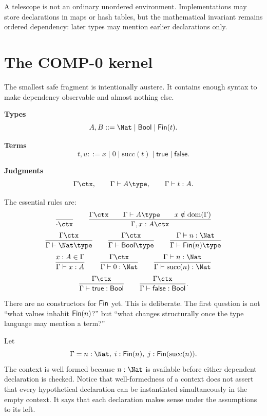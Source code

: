 \documentclass[11pt,openany]{book}
\begin{document}
\begin{warningbox}
A telescope is not an ordinary unordered environment. Implementations may store declarations in maps or hash tables, but the mathematical invariant remains ordered dependency: later types may mention earlier declarations only.
\end{warningbox}

\section{The COMP-0 kernel}

The smallest safe fragment is intentionally austere. It contains enough syntax to make dependency observable and almost nothing else.

\begin{formal}
\textbf{Types}
\[
  A,B ::= \Nat \mid \mathsf{Bool} \mid \Fin(t).
\]

\textbf{Terms}
\[
  t,u ::= x \mid 0 \mid \mathrm{succ}(t) \mid \mathsf{true} \mid \mathsf{false}.
\]

\textbf{Judgments}
\[
  \Gamma\ctx,
  \qquad \Gamma\vdash A\type,
  \qquad \Gamma\vdash t:A.
\]

The essential rules are:
\[
\frac{}{\cdot\ctx}
\qquad
\frac{\Gamma\ctx\qquad \Gamma\vdash A\type\qquad x\notin\mathrm{dom}(\Gamma)}
     {\Gamma,x:A\ctx}
\]
\[
\frac{\Gamma\ctx}{\Gamma\vdash \Nat\type}
\qquad
\frac{\Gamma\ctx}{\Gamma\vdash \mathsf{Bool}\type}
\qquad
\frac{\Gamma\vdash n:\Nat}{\Gamma\vdash \Fin(n)\type}
\]
\[
\frac{x:A\in\Gamma}{\Gamma\vdash x:A}
\qquad
\frac{\Gamma\ctx}{\Gamma\vdash 0:\Nat}
\qquad
\frac{\Gamma\vdash n:\Nat}{\Gamma\vdash \mathrm{succ}(n):\Nat}
\]
\[
\frac{\Gamma\ctx}{\Gamma\vdash \mathsf{true}:\mathsf{Bool}}
\qquad
\frac{\Gamma\ctx}{\Gamma\vdash \mathsf{false}:\mathsf{Bool}}.
\]
\end{formal}

There are no constructors for $\mathsf{Fin}$ yet. This is deliberate. The first question is not ``what values inhabit $\mathsf{Fin}(n)$?'' but ``what changes structurally once the type language may mention a term?''

\begin{workedexample}
Let
\[
  \Gamma = n:\Nat,\; i:\Fin(n),\; j:\Fin(\mathrm{succ}(n)).
\]
The context is well formed because $n:\Nat$ is available before either dependent declaration is checked. Notice that well-formedness of a context does not assert that every hypothetical declaration can be instantiated simultaneously in the empty context. It says that each declaration makes sense under the assumptions to its left.
\end{workedexample}
\end{document}

